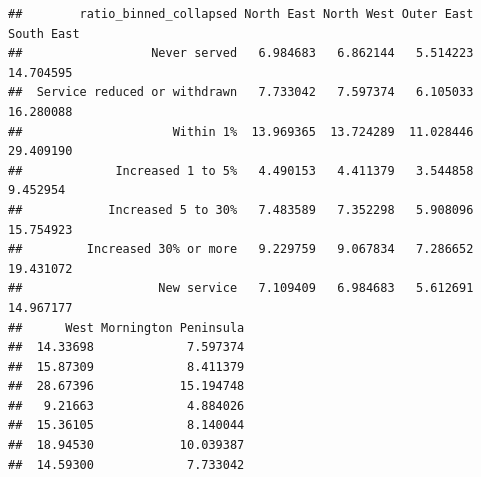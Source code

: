 \documentclass[preprint, 3p,
authoryear]{elsarticle} %
\begin{document}
\begin{verbatim}
##        ratio_binned_collapsed North East North West Outer East South East
##                  Never served   6.984683   6.862144   5.514223  14.704595
##  Service reduced or withdrawn   7.733042   7.597374   6.105033  16.280088
##                     Within 1%  13.969365  13.724289  11.028446  29.409190
##             Increased 1 to 5%   4.490153   4.411379   3.544858   9.452954
##            Increased 5 to 30%   7.483589   7.352298   5.908096  15.754923
##         Increased 30% or more   9.229759   9.067834   7.286652  19.431072
##                   New service   7.109409   6.984683   5.612691  14.967177
##      West Mornington Peninsula
##  14.33698             7.597374
##  15.87309             8.411379
##  28.67396            15.194748
##   9.21663             4.884026
##  15.36105             8.140044
##  18.94530            10.039387
##  14.59300             7.733042
\end{verbatim}
\end{document}
